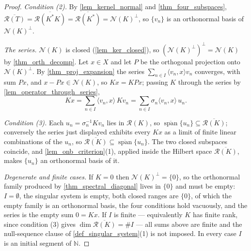 \documentclass[a4paper]{report}
\theoremstyle{plain}
\theoremstyle{definition}
\theoremstyle{remark}
\begin{document}
\begin{proof}
  \emph{Condition (2).}  By \cref{lem_kernel_normal} and \cref{thm_four_subspaces},
  $\overline{\mathcal{R}(T)} = \overline{\mathcal{R}(K^*K)} = \overline{\mathcal{R}(K^*)}
  = \mathcal{N}(K)^\perp$, so $\{v_n\}$ is an orthonormal basis of $\mathcal{N}(K)^\perp$.

  \emph{The series.}  $\mathcal{N}(K)$ is closed (\cref{lem_ker_closed}), so
  $(\mathcal{N}(K)^\perp)^\perp = \mathcal{N}(K)$ by \cref{thm_orth_decomp}.  Let
  $x \in X$ and let $P$ be the orthogonal projection onto $\mathcal{N}(K)^\perp$.  By
  \cref{thm_proj_expansion} the series $\sum_{n\in I}\langle v_n,x\rangle v_n$ converges,
  with sum $Px$, and $x - Px \in \mathcal{N}(K)$, so $Kx = KPx$; passing $K$ through the
  series by \cref{lem_operator_through_series},
  \[
    Kx = \sum_{n\in I}\langle v_n,x\rangle\,Kv_n
       = \sum_{n\in I}\sigma_n\langle v_n,x\rangle\,u_n .
  \]

  \emph{Condition (3).}  Each $u_n = \sigma_n^{-1}Kv_n$ lies in $\mathcal{R}(K)$, so
  $\overline{\operatorname{span}}\{u_n\} \subseteq \overline{\mathcal{R}(K)}$; conversely
  the series just displayed exhibits every $Kx$ as a limit of finite linear combinations of
  the $u_n$, so $\overline{\mathcal{R}(K)} \subseteq
  \overline{\operatorname{span}}\{u_n\}$.  The two closed subspaces coincide, and
  \cref{lem_onb_criterion}(1), applied inside the Hilbert space
  $\overline{\mathcal{R}(K)}$, makes $\{u_n\}$ an orthonormal basis of it.

  \emph{Degenerate and finite cases.}  If $K = 0$ then $\mathcal{N}(K)^\perp = \{0\}$, so
  the orthonormal family produced by \cref{thm_spectral_diagonal} lives in $\{0\}$ and must
  be empty: $I = \emptyset$, the singular system is empty, both closed ranges are $\{0\}$,
  of which the empty family is an orthonormal basis, the four conditions hold vacuously,
  and the series is the empty sum $0 = Kx$.  If $I$ is finite --- equivalently $K$ has
  finite rank, since condition (3) gives $\dim\overline{\mathcal{R}(K)} = \#I$ --- all sums
  above are finite and the null-sequence clause of \cref{def_singular_system}(1) is not
  imposed.  In every case $I$ is an initial segment of $\mathbb{N}$.
\end{proof}
\end{document}
